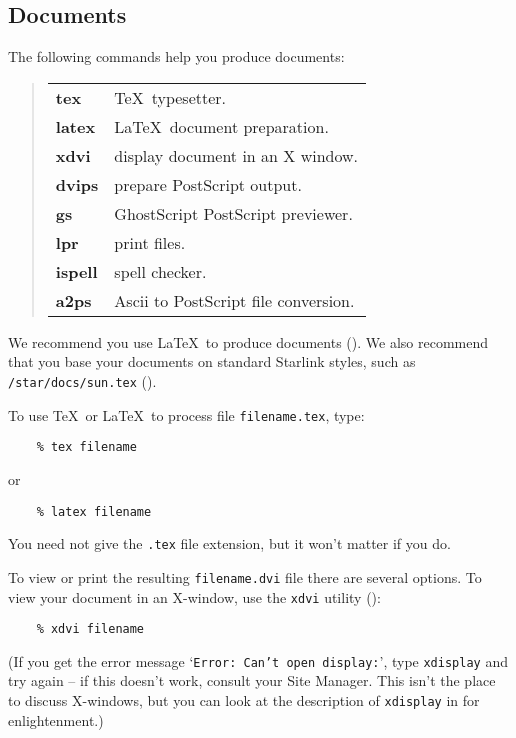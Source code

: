\subsection{Documents}
The following commands help you produce documents:
\begin{quote}
\begin{tabular}{lp{67mm}}

{\bf tex}   & \TeX\ typesetter.\\
{\bf latex} & \LaTeX\ document preparation.\\
{\bf xdvi}  & display document in an X window.\\
{\bf dvips} & prepare PostScript output.\\
{\bf gs}    & GhostScript PostScript previewer.\\
{\bf lpr}   & print files.\\
{\bf ispell} & spell checker.\\
{\bf a2ps} & Ascii to PostScript file conversion.

\end{tabular}
\end{quote}
We recommend you use \LaTeX\ to produce documents
().
We also recommend that you base your documents on standard Starlink styles,
such as {\tt /star/docs/sun.tex}
().

To use \TeX\ or \LaTeX\ to process file {\tt filename.tex}, type:
\begin{verbatim}
    % tex filename
\end{verbatim}
or
\begin{verbatim}
    % latex filename
\end{verbatim}
You need not give the {\tt .tex} file extension, but it won't matter if you
do. 

To view or print the resulting {\tt filename.dvi} file there are several
options. 
To view your document in an X-window, use the {\tt xdvi} utility
():
\begin{verbatim}
    % xdvi filename
\end{verbatim}
(If you get the error message `{\tt Error: Can't open display:}', type
{\tt xdisplay} and try again -- if this doesn't work, consult your Site
Manager.
This isn't the place to discuss X-windows, but you can look at the description
of {\tt xdisplay} in 
 for enlightenment.)

